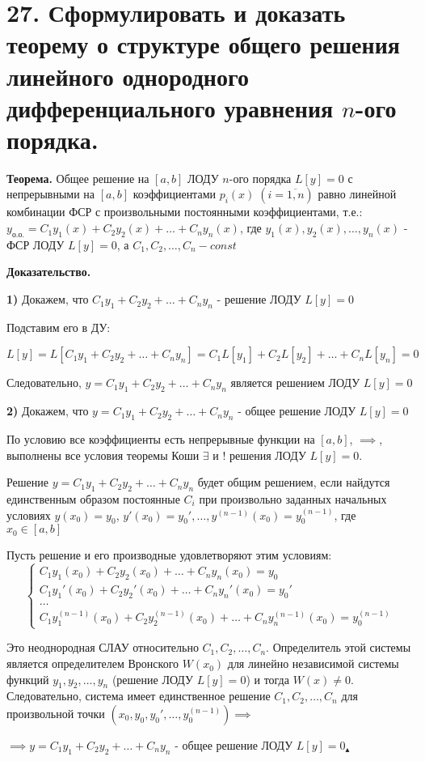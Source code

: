 \documentclass[11pt]{article}
\begin{document}
\section*{27. Сформулировать и доказать теорему о структуре общего решения линейного однородного дифференциального уравнения $n$-ого порядка.}
\par\textbf{Теорема.} Общее решение на $[a, b]$ ЛОДУ $n$-ого порядка $L[y] = 0$ с непрерывными на $[a, b]$ коэффициентами $p_{i}(x) \;(i = \overline{1, n})$ равно линейной комбинации ФСР с произвольными постоянными коэффициентами, т.е.: $y_{\text{о.о.}} = C_{1}y_{1}(x) + C_{2}y_{2}(x) + \dots + C_{n}y_{n}(x)$, где $y_{1}(x), y_{2}(x), \dots, y_{n}(x)$ - ФСР ЛОДУ $L[y] = 0$, а $C_{1}, C_{2}, \dots, C_{n} - const$
\par\textbf{Доказательство.}
\par\textbf{1)} Докажем, что $C_{1}y_{1} + C_{2}y_{2} + \dots + C_{n}y_{n}$ - решение ЛОДУ $L[y] = 0$
\par Подставим его в ДУ:
\par $L[y] = L[C_{1}y_{1} + C_{2}y_{2} + \dots + C_{n}y_{n}] = C_{1}L[y_{1}] + C_{2}L[y_{2}] + \dots + C_{n}L[y_{n}] = 0$
\par Следовательно, $y = C_{1}y_{1} + C_{2}y_{2} + \dots + C_{n}y_{n}$ является решением ЛОДУ $L[y] = 0$
\par\textbf{2)} Докажем, что $y = C_{1}y_{1} + C_{2}y_{2} + \dots + C_{n}y_{n}$ - общее решение ЛОДУ $L[y] = 0$
\par По условию все коэффициенты есть непрерывные функции на  $[a, b]$, $\implies$, выполнены все условия теоремы Коши $\exists$ и $!$ решения ЛОДУ $L[y] = 0$.
\par Решение $y = C_{1}y_{1} + C_{2}y_{2} + \dots + C_{n}y_{n}$ будет общим решением, если найдутся единственным образом постоянные $C_{i}$ при произвольно заданных начальных условиях $y(x_{0}) = y_{0}$, $y'(x_{0}) = y_{0}', \dots, y^{(n-1)}(x_{0}) = y_{0}^{(n-1)}$, где $x_{0} \in [a, b]$
\par Пусть решение и его производные удовлетворяют этим условиям:
$$\left\{\begin{array}{l}
C_{1}y_{1}(x_{0}) + C_{2}y_{2}(x_{0}) + \dots + C_{n}y_{n}(x_{0}) = y_{0} \\
C_{1}y_{1}'(x_{0}) + C_{2}y_{2}'(x_{0}) + \dots + C_{n}y_{n}'(x_{0}) = y_{0}' \\
\dots \\
C_{1}y_{1}^{(n-1)}(x_{0}) + C_{2}y_{2}^{(n-1)}(x_{0}) + \dots + C_{n}y_{n}^{(n-1)}(x_{0}) = y_{0}^{(n-1)}
\end{array}\right.$$
\par Это неоднородная СЛАУ относительно $C_{1}, C_{2}, \dots, C_{n}$. Определитель этой системы является определителем Вронского $W(x_{0})$ для линейно независимой системы функций $y_{1}, y_{2}, \dots, y_{n}$ (решение ЛОДУ $L[y] = 0$) и тогда $W(x) \neq 0$. Следовательно, система имеет единственное решение $C_{1}, C_{2}, \dots, C_{n}$ для произвольной точки $(x_{0}, y_{0}, y_{0}', \dots, y_{0}^{(n-1)}) \implies$
\par $\implies y = C_{1}y_{1} + C_{2}y_{2} + \dots + C_{n}y_{n}$ - общее решение ЛОДУ $L[y] = 0 _{\blacktriangle}$
\end{document}

